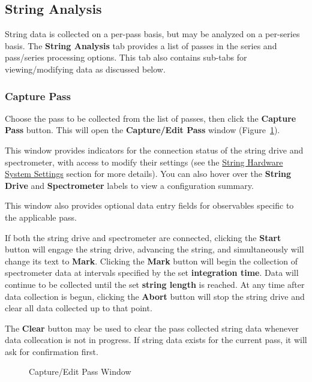 \documentclass[10pt,letterpaper,titlepage]{article}
\begin{document}
    \subsection{String Analysis}
    String data is collected on a per-pass basis, but may be analyzed on a per-series basis. The \textbf{String Analysis} tab provides a list of passes in the series and pass/series processing options. This tab also contains sub-tabs for viewing/modifying data as discussed below.
    
    \subsubsection{Capture Pass}
    Choose the pass to be collected from the list of passes, then click the \textbf{Capture Pass} button. This will open the \textbf{Capture/Edit Pass} window (Figure~\ref{fig:capture_edit_pass}).\par
    This window provides indicators for the connection status of the string drive and spectrometer, with access to modify their settings (see the \hyperref[sec:string_hardware_settings]{String Hardware System Settings} section for more details). You can also hover over the \textbf{String Drive} and \textbf{Spectrometer} labels to view a configuration summary.\par
    This window also provides optional data entry fields for observables specific to the applicable pass.\par
    If both the string drive and spectrometer are connected, clicking the \textbf{Start} button will engage the string drive, advancing the string, and simultaneously will change its text to \textbf{Mark}. Clicking the \textbf{Mark} button will begin the collection of spectrometer data at intervals specified by the set \textbf{integration time}. Data will continue to be collected until the set \textbf{string length} is reached. At any time after data collection is begun, clicking the \textbf{Abort} button will stop the string drive and clear all data collected up to that point.\par
    The \textbf{Clear} button may be used to clear the pass collected string data whenever data collecation is not in progress. If string data exists for the current pass, it will ask for confirmation first.
    \begin{figure}[h]
        \centering
        \caption{Capture/Edit Pass Window}
        \label{fig:capture_edit_pass}
    \end{figure}
    \newpage
\end{document}
